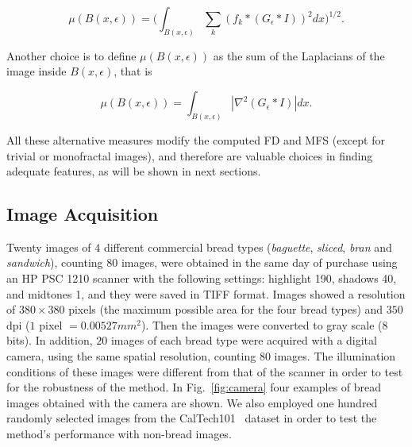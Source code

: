 \begin{equation}
\mu(B(x,\epsilon)) = (\int_{B(x,\epsilon)}{\sum_{k}{(f_{k} \ast (G_{\epsilon} \ast I))^{2}} dx)^{1/2}}.
\label{eqn:gradient}
\end{equation}

Another choice is to define $\mu(B(x, \epsilon))$ as the sum of the Laplacians of the image inside $B(x, \epsilon)$, that is

\begin{equation}
\mu(B(x,\epsilon)) = \int_{B(x,\epsilon)}|\nabla^2 (G_{\epsilon} \ast I)| dx.
\label{eqn:laplacian}
\end{equation}

All these alternative measures modify the computed FD and MFS (except for trivial or monofractal images), and therefore are valuable choices in finding adequate features, as will be shown in next sections.

\subsection{Image Acquisition}
\label{sec:7}
Twenty images of $4$ different commercial bread types ({\em baguette}, {\em sliced}, {\em bran} and {\em sandwich}), counting $80$ images, were obtained in the same day of purchase using an HP PSC 1210 scanner with the following settings: highlight 190, shadows 40, and midtones 1, and they were saved in TIFF format. Images showed a resolution of $380 \times 380$ pixels (the maximum possible area for the four bread types) and $350$ dpi ($1$ pixel $= 0.00527 mm^{2}$). Then the images were converted to gray scale ($8$ bits). In addition, $20$ images of each bread type were acquired with a digital camera, using the same spatial resolution, counting $80$ images. The illumination conditions of these images were different from that of the scanner in order to test for the robustness of the method. In Fig.~\ref{fig:camera} four examples of bread images obtained with the camera are shown. We also employed one hundred randomly selected images from the CalTech101~\cite{FeiFei04} dataset in order to test the method's performance with non-bread images.

